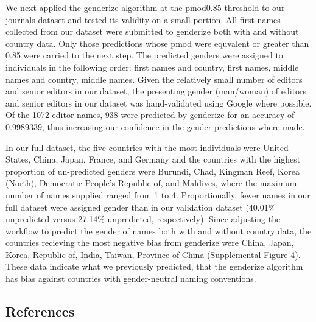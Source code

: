\documentclass[11pt,]{article}
\begin{document}
We next applied the genderize algorithm at the pmod0.85 threshold to our
journals dataset and tested its validity on a small portion. All first
names collected from our dataset were submitted to genderize both with
and without country data. Only those predictions whose pmod were
equvalent or greater than 0.85 were carried to the next step. The
predicted genders were assigned to individuals in the following order:
first names and country, first names, middle names and country, middle
names. Given the relatively small number of editors and senior editors
in our dataset, the presenting gender (man/woman) of editors and senior
editors in our dataset was hand-validated using Google where possible.
Of the 1072 editor names, 938 were predicted by genderize for an
accuracy of 0.9989339, thus increasing our confidence in the gender
predictions where made.

In our full dataset, the five countries with the most individuals were
United States, China, Japan, France, and Germany and the countries with
the highest proportion of un-predicted genders were Burundi, Chad,
Kingman Reef, Korea (North), Democratic People's Republic of, and
Maldives, where the maximum number of names supplied ranged from 1 to 4.
Proportionally, fewer names in our full dataset were assigned gender
than in our validation dataset (40.01\% unpredicted versus 27.14\%
unpredicted, respectively). Since adjusting the workflow to predict the
gender of names both with and without country data, the countries
recieving the most negative bias from genderize were China, Japan,
Korea, Republic of, India, Taiwan, Province of China (Supplemental
Figure 4). These data indicate what we previously predicted, that the
genderize algorithm has bias against countries with gender-neutral
naming conventions.

\subsection{References}\label{references}
\end{document}
